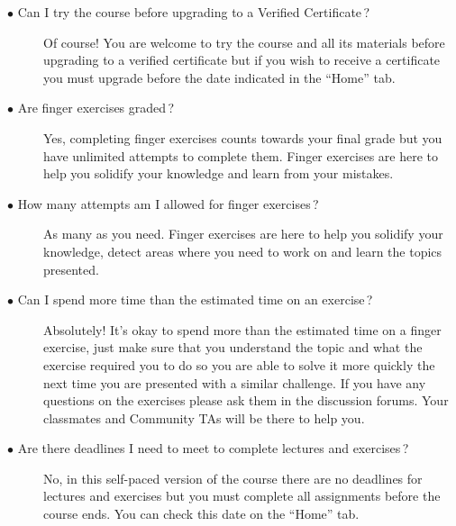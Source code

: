 \documentclass{article}
\newcommand{\question}[1]{\item[$\bullet$ #1] \hfil}
\newenvironment{answer}{}{}
\newenvironment{faq}{\begin{description}}{\end{description}}
\begin{document}
			\begin{faq}
				\question{Can I try the course before upgrading to a Verified Certificate\,?}
				
				\begin{answer}
					Of course! You are welcome to try the course and all its materials before
					upgrading to a verified certificate but if you wish to receive a certificate you
					must upgrade before the date indicated in the ``Home'' tab.
				\end{answer}
				
				\question{Are finger exercises graded\,?}
				
				\begin{answer}
					Yes, completing finger exercises counts towards your final grade but you
					have unlimited attempts to complete them. Finger exercises are here to help
					you solidify your knowledge and learn from your mistakes.
				\end{answer}
				
				\question{How many attempts am I allowed for finger exercises\,?}
				
				\begin{answer}
					As many as you need. Finger exercises are here to help you solidify your
					knowledge, detect areas where you need to work on and learn the topics
					presented.
				\end{answer}
				
				\question{Can I spend more time than the estimated time on an exercise\,?}
				
				\begin{answer}
					Absolutely! It’s okay to spend more than the estimated time on a finger
					exercise, just make sure that you understand the topic and what the exercise
					required you to do so you are able to solve it more quickly the next time you
					are presented with a similar challenge. If you have any questions on the
					exercises please ask them in the discussion forums. Your classmates and
					Community TAs will be there to help you.
				\end{answer}
				
				\question{Are there deadlines I need to meet to complete lectures and exercises\,?}
				
				\begin{answer}
					No, in this self-paced version of the course there are no deadlines for lectures
					and exercises but you must complete all assignments before the course
					ends. You can check this date on the ``Home'' tab.
				\end{answer}
				

\end{faq}
\end{document}
